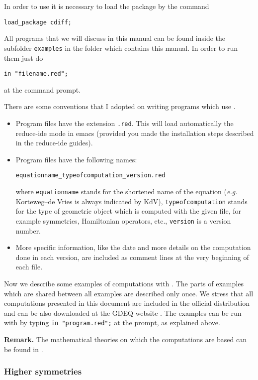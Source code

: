 In order to use \cdiff it is necessary to load the package by the command
\begin{verbatim}
load_package cdiff;
\end{verbatim}

All programs that we will discuss in this manual can be found inside the
subfolder \texttt{examples} in the folder which contains this manual. In order
to run them just do
\begin{verbatim}
in "filename.red";
\end{verbatim}
at the \REDUCE command prompt.

There are some conventions that I adopted on writing programs which use \cdiff.
\begin{itemize}
\item Program files have the extension \texttt{.red}. This will load
  automatically the reduce-ide mode in emacs (provided you made the
  installation steps described in the reduce-ide guides).
\item Program files have the following names:
  \begin{center}
    \texttt{equationname\_typeofcomputation\_version.red}
  \end{center}
  where \texttt{equationname} stands for the shortened name of the equation
  (\emph{e.g.} Korteweg--de Vries is always indicated by KdV),
  \texttt{typeofcomputation} stands for the type of geometric object which is
  computed with the given file, for example symmetries, Hamiltonian operators,
  etc., \texttt{version} is a version number.
\item More specific information, like the date and more details on the
  computation done in each version, are included as comment lines at the very
  beginning of each file.
\end{itemize}

Now we describe some examples of computations with \cdiff. The parts of
examples which are shared between all examples are described only once. We
stress that all computations presented in this document are included in the
official \REDUCE distribution and can be also downloaded at the GDEQ website
\cite{gdeq}. The examples can be run with \REDUCE by typing \texttt{in
  "program.red";} at the \REDUCE prompt, as explained above.

\textbf{Remark.} The mathematical theories on which the computations are based
can be found in \cite{Many,KKV}.

\subsubsection{Higher symmetries}\label{sec:higher-symmetries}

